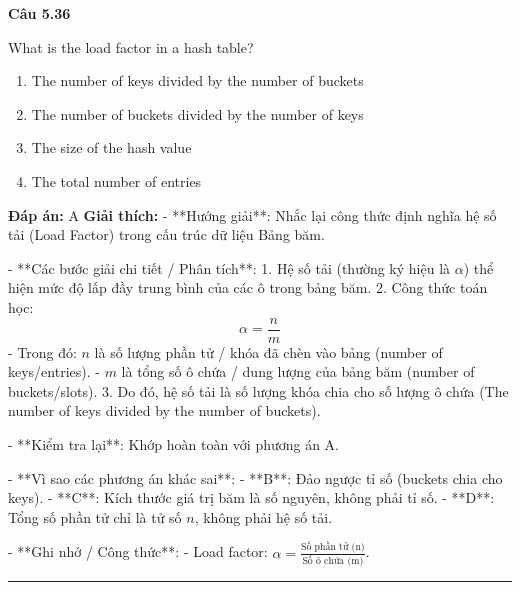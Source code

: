 \documentclass[11pt,a4paper]{article}
\newenvironment{question}[1]{%
  \par\vspace{1em}\noindent\textbf{\large Câu #1}\par\vspace{0.4em}
}{%
  \par\vspace{1em}\hrule\vspace{0.6em}
}
\newenvironment{choices}{%
  \begin{enumerate}[label=\textbf{\Alph*.},leftmargin=2.2em,itemsep=2pt,topsep=3pt]
}{%
  \end{enumerate}
}
\newcommand{\choice}{\item}
\begin{document}
\begin{question}{5.36}
What is the load factor in a hash table?
\begin{choices}
\choice The number of keys divided by the number of buckets
\choice The number of buckets divided by the number of keys
\choice The size of the hash value
\choice The total number of entries
\end{choices}
\textbf{Đáp án:} A
\textbf{Giải thích:} - **Hướng giải**:
  Nhắc lại công thức định nghĩa hệ số tải (Load Factor) trong cấu trúc dữ liệu Bảng băm.

- **Các bước giải chi tiết / Phân tích**:
  1. Hệ số tải (thường ký hiệu là \(\alpha\)) thể hiện mức độ lấp đầy trung bình của các ô trong bảng băm.
  2. Công thức toán học:
     \[ \alpha = \frac{n}{m} \]
     - Trong đó: \(n\) là số lượng phần tử / khóa đã chèn vào bảng (number of keys/entries).
     - \(m\) là tổng số ô chứa / dung lượng của bảng băm (number of buckets/slots).
  3. Do đó, hệ số tải là số lượng khóa chia cho số lượng ô chứa (The number of keys divided by the number of buckets).

- **Kiểm tra lại**:
  Khớp hoàn toàn với phương án A.

- **Vì sao các phương án khác sai**:
  - **B**: Đảo ngược tỉ số (buckets chia cho keys).
  - **C**: Kích thước giá trị băm là số nguyên, không phải tỉ số.
  - **D**: Tổng số phần tử chỉ là tử số \(n\), không phải hệ số tải.

- **Ghi nhớ / Công thức**:
  - Load factor: \(\alpha = \frac{\text{Số phần tử (n)}}{\text{Số ô chứa (m)}}\).
\end{question}
\end{document}
